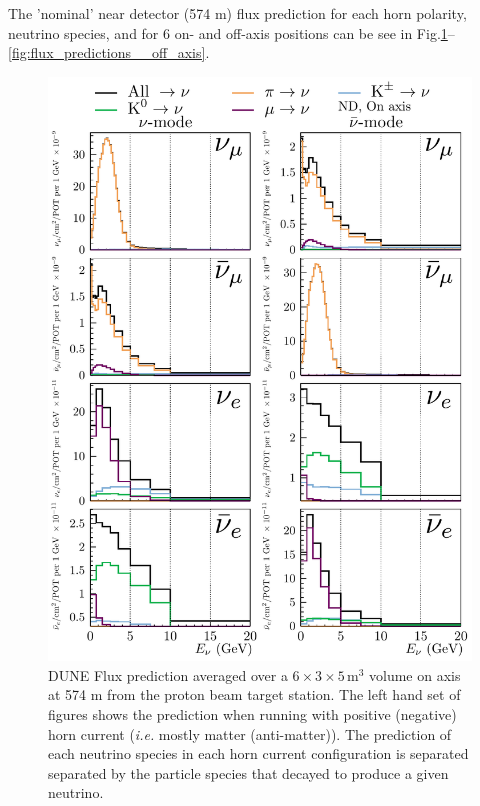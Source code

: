 \documentclass{article}
\begin{document}
The 'nominal' near detector (574 m) flux prediction for each horn polarity, neutrino species, and for 6 on- and off-axis positions can be see in Fig.\ref{fig:flux_predictions__on_axis}--\ref{fig:flux_predictions__off_axis}.

\begin{figure}
  \includegraphics[width=\textwidth]{plots/fluxpredcompvar/ND_HadronParentFluxComponents_0m_offaxis}
  \caption{DUNE Flux prediction averaged over a $6\times 3\times 5\,\textrm{m}^{3}$ volume on axis at 574 m from the proton beam target station. The left hand set of figures shows the prediction when running with positive (negative) horn current (\textit{i.e.} mostly matter (anti-matter)). The prediction of each neutrino species in each horn current configuration is separated separated by the particle species that decayed to produce a given neutrino.}
  \label{fig:flux_predictions__on_axis}
\end{figure}
\end{document}
